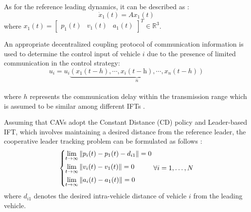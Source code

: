 \documentclass[a4paper]{cas-sc}
\begin{document}
As for the reference leading dynamics, it can be described as \citep{Hengster-Movric2015}:
\begin{equation}
  {\dot x_1}\left( t \right) = A{x_1}\left( t \right)
  \label{eq6}
\end{equation}
where ${x_1}\left( t \right) = {\left[ {\begin{array}{*{20}{c}}
          {{p_1}\left( t \right)} & {{v_1}\left( t \right)} & {{a_1}\left( t \right)}
        \end{array}} \right]^T} \in {\mathbb{R}^3}$.

An appropriate decentralized coupling protocol of communication information is used to determine the control input of vehicle $i$ due to the presence of limited communication in the control strategy:
\begin{equation}
  {u_i} = {u_i}\underbrace {\left( {{x_1}\left( {t - h} \right), \cdots ,{x_i}\left( {t - {\text{h}}} \right), \cdots ,{x_n}\left( {t - h} \right)} \right)}_n
  \label{eq7}
\end{equation}\\
where $h$ represents the communication delay within the transmission range which is assumed to be similar among different IFTs \citep{Zheng2015,Vukadinovic2018,Vu2020,Martin-Sacristan2020,Pirani2022}.

Assuming that CAVs adopt the Constant Distance (CD) policy and Leader-based IFT, which involves maintaining a desired distance from the reference leader, the cooperative leader tracking problem can be formulated as follows \citep{wang2018review}:
\begin{equation}
  \left\{ \begin{gathered}
    \mathop {\lim }\limits_{t \to \infty } \left\| {{p_i}(t) - {p_1}(t) - {d_{i1}}} \right\| = 0 \hfill \\
    \mathop {\lim }\limits_{t \to \infty } \left\| {{v_i}(t) - {v_1}(t)} \right\| = 0 \hfill \\
    \mathop {\lim }\limits_{t \to \infty } \left\| {{a_i}(t) - {a_1}(t)} \right\| = 0 \hfill \\
  \end{gathered}  \right.\forall i = 1, \ldots ,N
  \label{eq8}
\end{equation}
where $d_{i1}$ denotes the desired intra-vehicle distance of vehicle $i$ from the leading vehicle.
\end{document}
